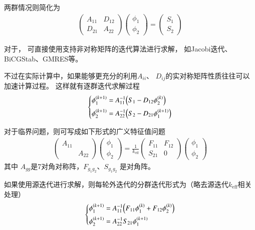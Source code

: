 两群情况则简化为
\begin{align}
  \begin{pmatrix}
  A_{11} & D_{12} \\
  D_{21} & A_{22}
  \end{pmatrix}
  \begin{pmatrix}
  \phi_1 \\ \phi_2
  \end{pmatrix}
  =
  \begin{pmatrix}
  S_1 \\ S_2
  \end{pmatrix}
  \label{equ:program.group.g2equ.fixs}
\end{align}

对于，
可直接使用支持非对称矩阵的迭代算法进行求解，
如Jacobi迭代、BiCGStab、GMRES等。

不过在实际计算中，如果能够更充分的利用$A_{ii}$、
$D_{ij}$的实对称矩阵性质往往可以加速计算过程。
这样就有逐群迭代求解过程
\begin{align}
  \left\{
  \begin{aligned}
    \phi_1^{(k+1)}&=A_{11}^{-1}\pb[B]{S_1-D_{12}\phi_2^{(k)}}\\
    \phi_2^{(k+1)}&=A_{22}^{-1}\pb[B]{S_2-D_{21}\phi_1^{(k+1)}}
  \end{aligned}
  \right.
\end{align}

对于临界问题，则可写成如下形式的广义特征值问题
\begin{align}
  \begin{pmatrix}
  A_{11} &  \\
   & A_{22}
  \end{pmatrix}
  \begin{pmatrix}
  \phi_1 \\ \phi_2
  \end{pmatrix}
  =\frac{1}{k_\mathrm{eff}}
    \begin{pmatrix}
    F_{11} & F_{12} \\
    S_{21} & 0
    \end{pmatrix}
  \begin{pmatrix}
    \phi_1 \\ \phi_2
  \end{pmatrix}
\end{align}
其中 $A_{gg}$是7对角对称阵，$F_{g_1g_2}$、$S_{g_1g_2}$ 是对角阵。

如果使用源迭代进行求解，则每轮外迭代的分群迭代形式为（略去源迭代$k_\mathrm{eff}$相关处理）
\begin{align}
  \left\{
  \begin{aligned}
    \phi_1^{(k+1)}&=A_{11}^{-1}\pb[B]{F_{11}\phi_1^{(k)}+F_{12}\phi_2^{(k)}}\\
    \phi_2^{(k+1)}&=A_{22}^{-1}S_{21}\phi_1^{(k+1)}
  \end{aligned}
  \right.
  \label{equ:program.group.g2equ.keff}
\end{align}

